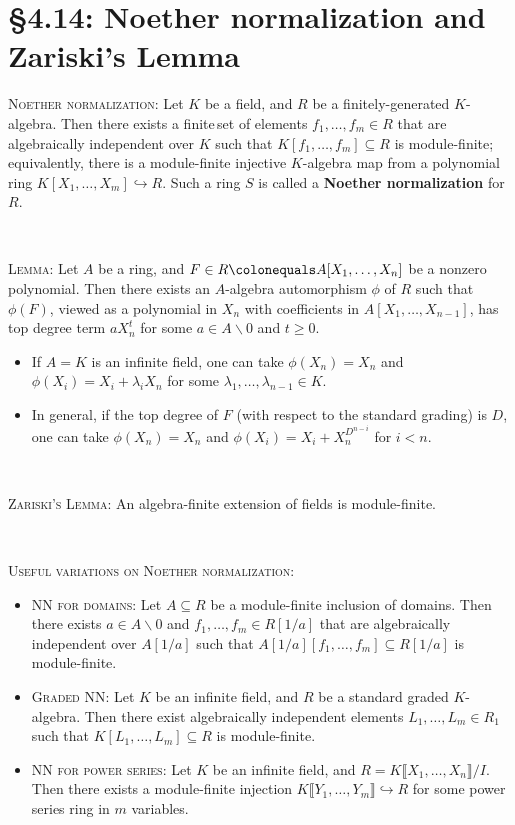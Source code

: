 \documentclass[12pt]{amsart}
\newcommand{\1}{\mathbbm{1}}
\newcommand{\showsol}[1]{\def\displaysol{#1}}
\newcommand\ceq{\colonequals}
\begin{document}
\showsol{0}
	
	\thispagestyle{empty}
	
	\section*{\S4.14: Noether normalization and Zariski's Lemma}	

\begin{framed}

\noindent \textsc{Noether normalization:} Let $K$ be a field, and $R$ be a finitely-generated $K$-algebra. Then there exists a finite\footnotemark\,set of elements $f_1,\dots,f_m\in R$ that are algebraically independent over $K$ such that $K[f_1,\dots,f_m] \subseteq R$ is module-finite; equivalently, there is a module-finite injective $K$-algebra map from a polynomial ring ${K[X_1,\dots,X_m] \hookrightarrow R}$. Such a ring $S$ is called a \textbf{Noether normalization} for~$R$.

\

\noindent \textsc{Lemma:} Let $A$ be a ring, and $F \in R \ceq A[X_1,\dots,X_n]$ be a nonzero polynomial. Then there exists an $A$-algebra automorphism $\phi$ of $R$ such that $\phi(F)$, viewed as a polynomial in $X_n$ with coefficients in $A[X_1,\dots, X_{n-1}]$, has top degree term $a X_n^t$ for some $a\in A\smallsetminus 0$ and $t\geq 0$.
\begin{itemize}
\item If $A=K$ is an infinite field, one can take $\phi(X_n)=X_n$ and $\phi(X_i) = X_i +\lambda_i X_n$ for some $\lambda_1,\dots,\lambda_{n-1} \in K$.
\item In general, if the top degree of $F$ (with respect to the standard grading) is $D$, one can take $\phi(X_n) = X_n$ and $\phi(X_i) = X_i + X_n^{D^{n-i}}$ for $i<n$.
\end{itemize}

\


\noindent \textsc{Zariski's Lemma:} An algebra-finite extension of fields is module-finite.

\

\noindent \textsc{Useful variations on Noether normalization:}
\begin{itemize}
\item \textsc{NN for domains:} Let $A\subseteq R$ be a module-finite inclusion of domains\footnotemark. Then there exists $a\in A\smallsetminus 0$ and $f_1,\dots,f_m\in R[1/a]$ that are algebraically independent over $A[1/a]$ such that $A[1/a][f_1,\dots,f_m] \subseteq R[1/a]$ is module-finite.
\item \textsc{Graded NN:} Let $K$ be an infinite field, and $R$ be a standard graded $K$-algebra. Then there exist algebraically independent elements $L_1,\dots,L_m \in R_1$ such that $K[L_1,\dots,L_m] \subseteq R$ is module-finite.
\item \textsc{NN for power series:} Let $K$ be an infinite field, and $R=K\llbracket X_1,\dots,X_n \rrbracket / I$. Then there exists a module-finite injection $K\llbracket Y_1,\dots,Y_m \rrbracket \hookrightarrow R$ for some power series ring in $m$ variables.
\end{itemize}

 \end{framed}
\end{document}

